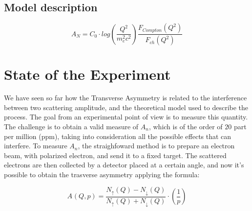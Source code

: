  \medskip

\subsection{Model description}
\medskip

\begin{equation}
A_{N} = C_{0} \cdot log(\dfrac{Q^{2}}{m_{e}^{2} c^{2}}) \dfrac{F_{Compton}(Q^{2})}{F_{ch}(Q^{2})}
\end{equation}

\section{State of the Experiment}

 \medskip

We have seen so far how the Transverse Asymmetry is related to the interference between two scattering amplitude, and the theoretical model used to describe the process. The goal from an experimental point of view is to measure this quantity. The challenge is to obtain a valid measure of $A_{n}$, which is of the order of $20$ part per million (ppm), taking into consideration all the possible effects that can interfere. To measure $A_{n}$, the straighfoward method is to prepare an electron beam, with polarized electron, and send it to a fixed target. The scattered electrons are then collected by a detector placed at a certain angle, and now it's possible to obtain the trasverse asymmetry applying the formula:

\begin{equation}
A_{} (Q,p) = \dfrac{N_{\uparrow}(Q) - N_{\downarrow}(Q)}{N_{\uparrow}(Q) + N_{\downarrow}(Q)} \cdot (\frac{1}{p})   
\end{equation} 

